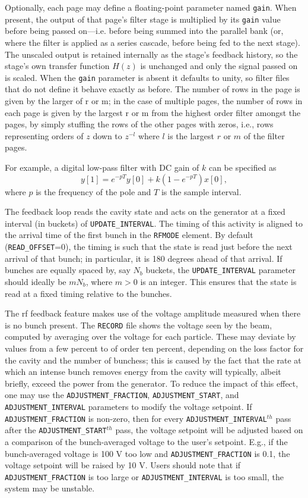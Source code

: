 Optionally, each page may define a floating-point parameter named \verb|gain|. When present, the output of that
page's filter stage is multiplied by its \verb|gain| value before being passed on---i.e. before being summed into
the parallel bank (or, where the filter is applied as a series cascade, before being fed to the next stage). The
unscaled output is retained internally as the stage's feedback history, so the stage's own transfer function
$H(z)$ is unchanged and only the signal passed on is scaled. When the \verb|gain| parameter is absent it defaults
to unity, so filter files that do not define it behave exactly as before.
The number of rows in the page is given by the larger of r or m; in the case of multiple pages,
the number of rows in each page is given by the largest r or m from the highest order filter amongst the pages, by
simply stuffing the rows of the other pages with zeros, i.e., rows representing orders of $z$ down to $z^{-l}$ where $l$ is
the largest $r$ or $m$ of the filter pages.

For example, a digital low-pass filter with DC gain of $k$ can be specified as
\begin{equation}
y[1] = e^{-pT} y[0] + k (1 - e^{-pT}) x[0],
\end{equation}
where $p$ is the frequency of the pole and $T$ is the sample interval.

The feedback loop reads the cavity state and acts on the generator at a fixed interval (in buckets) of
\verb|UPDATE_INTERVAL|. 
The timing of this activity is aligned to the arrival time of the first bunch in the \verb|RFMODE| element.
By default (\verb|READ_OFFSET|=0), the timing is such that the state is read just before the next arrival of
that bunch; in particular, it is 180 degrees ahead of that arrival.
If bunches are equally spaced by, say $N_b$ buckets, the \verb|UPDATE_INTERVAL| parameter should ideally be
$m N_b$, where $m>0$ is an integer.
This ensures that the state is read at a fixed timing relative to the bunches.

The rf feedback feature makes use of the voltage amplitude measured when there is no bunch present.
The \verb|RECORD| file shows the voltage seen by the beam, computed by averaging over the voltage for
each particle.
These may deviate by values from a few percent to of order ten percent, depending on the loss factor for the
cavity and the number of bunchess; this is caused by the fact that the rate at which an intense bunch removes
energy from the cavity will typically, albeit briefly, exceed the power from the generator.
To reduce the impact of this effect, one may use the \verb|ADJUSTMENT_FRACTION|, \verb|ADJUSTMENT_START|, and \verb|ADJUSTMENT_INTERVAL|
parameters to modify the voltage setpoint.
If \verb|ADJUSTMENT_FRACTION| is non-zero, then for every \verb|ADJUSTMENT_INTERVAL|$^{th}$ pass after the 
\verb|ADJUSTMENT_START|$^{th}$ pass, the voltage setpoint will be adjusted based on a comparison of the bunch-averaged
voltage to the user's setpoint.
E.g., if the bunch-averaged voltage is 100 V too low and \verb|ADJUSTMENT_FRACTION| is 0.1, the voltage setpoint will
be raised by 10 V.
Users should note that if \verb|ADJUSTMENT_FRACTION| is too large or \verb|ADJUSTMENT_INTERVAL| is too small, the system
may be unstable.

